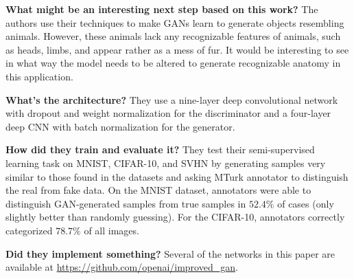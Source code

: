 \noindent\textbf{What might be an interesting next step based on this work?}
The authors use their techniques to make GANs learn to generate objects
resembling animals. However, these animals lack any recognizable features of
animals, such as heads, limbs, and appear rather as a mess of fur. It would be
interesting to see in what way the model needs to be altered to generate
recognizable anatomy in this application. 

\noindent\textbf{What's the architecture?} They use a nine-layer deep
convolutional network with dropout and weight normalization for the
discriminator and a four-layer deep CNN with batch normalization for the
generator.

\noindent\textbf{How did they train and evaluate it?} They test their
semi-supervised learning task on MNIST, CIFAR-10, and SVHN by generating samples
very similar to those found in the datasets and asking MTurk annotator to
distinguish the real from fake data. On the MNIST dataset, annotators were able
to distinguish GAN-generated samples from true samples in $52.4\%$ of cases
(only slightly better than randomly guessing). For the CIFAR-10, annotators
correctly categorized $78.7\%$ of all images.


\noindent\textbf{Did they implement something?} Several of the networks in this
paper are available at \url{https://github.com/openai/improved_gan}. 

